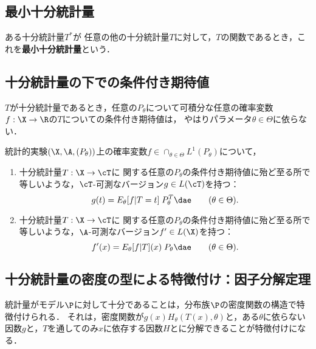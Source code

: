 \documentclass[uplatex,dvipdfmx]{jsreport}
\begin{document}
\subsection{最小十分統計量}

\begin{definition}
    ある十分統計量$T^*$が
    任意の他の十分統計量$T$に対して，$T$の関数であるとき，これを\textbf{最小十分統計量}という．
\end{definition}

\subsection{十分統計量の下での条件付き期待値}

\begin{tcolorbox}[colframe=ForestGreen, colback=ForestGreen!10!white,breakable,colbacktitle=ForestGreen!40!white,coltitle=black,fonttitle=\bfseries\sffamily,
title=]
    $T$が十分統計量であるとき，任意の$P_\theta$について可積分な任意の確率変数$f:\X\to\R$の$T$についての条件付き期待値は，
    やはりパラメータ$\theta\in\Theta$に依らない．
\end{tcolorbox}

\begin{proposition}\label{prop-expectation-given-sufficient-statistics}
    統計的実験$(\X,\A,(P_\theta))$上の確率変数$f\in \cap_{\theta\in\Theta}L^1(P_\theta)$について，
    \begin{enumerate}
        \item 十分統計量$T:\X\to\cT$に
        関する任意の$P_\theta$の条件付き期待値に殆ど至る所で等しいような，$\cT$-可測なバージョン$g\in L(\cT)$を持つ：
        \[g(t)=E_\theta[f|T=t]\;P^T_\theta\dae\qquad(\theta\in\Theta).\]
        \item 十分統計量$T:\X\to\cT$に
        関する任意の$P_\theta$の条件付き期待値に殆ど至る所で等しいような，$\A$-可測なバージョン$f'\in L(\X)$を持つ：
        \[f'(x)=E_\theta[f|T](x)\;P_\theta\dae\qquad(\theta\in\Theta).\]
    \end{enumerate}
\end{proposition}

\subsection{十分統計量の密度の型による特徴付け：因子分解定理}

\begin{tcolorbox}[colframe=ForestGreen, colback=ForestGreen!10!white,breakable,colbacktitle=ForestGreen!40!white,coltitle=black,fonttitle=\bfseries\sffamily,
title=]
    統計量がモデル$\P$に対して十分であることは，分布族$\P$の密度関数の構造で特徴付けられる．
    それは，密度関数が$g(x)H_\theta(T(x),\theta)$と，ある$\theta$に依らない因数$g$と，$T$を通してのみ$x$に依存する因数$H$とに分解できることが特徴付けになる．
\end{tcolorbox}
\end{document}
